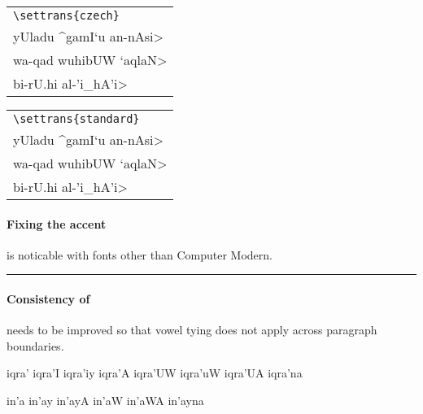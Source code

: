 \documentclass[10pt,a4paper]{article}
\newcommand{\phon}[1]{{\showfalse\arabfalse\transtrue\<#1>\/}}
\begin{document}
\bigskip

\begin{tabular}{l}
\lstinline|\settrans{czech}|    \\[6pt]
\<yUladu ^gamI`u an-nAsi>       \\
\<wa-qad wuhibUW `aqlaN>        \\
\<bi-rU.hi al-'i_hA'i>          \\
\end{tabular}

\medskip

\begin{tabular}{l}
\lstinline|\settrans{standard}| \\[6pt]
\<yUladu ^gamI`u an-nAsi>       \\
\<wa-qad wuhibUW `aqlaN>        \\
\<bi-rU.hi al-'i_hA'i>          \\
\end{tabular}

\paragraph{Fixing the \protect\phon{_h} accent}
is noticable with fonts other than Computer Modern.

\bigskip

\hrule

\paragraph{Consistency of \protect\phon{wa.sla}}
needs to be improved so that vowel tying does not apply across
paragraph boundaries.


\medskip

\begin{RLtext}
iqra'
iqra'I
iqra'iy
iqra'A
iqra'UW
iqra'uW
iqra'UA
iqra'na
\end{RLtext}

\medskip

\begin{RLtext}
\fullvocalize
in'a
in'ay
in'ayA
in'aW
in'aWA
in'ayna
\end{RLtext}
\end{document}

